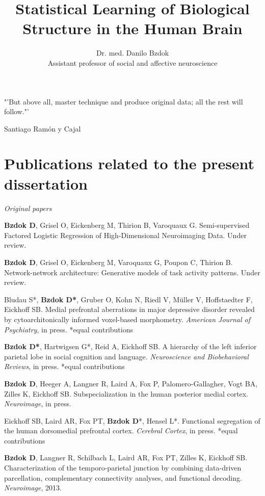 \documentclass[authoryear,review,3p]{elsarticle}
\begin{document}
  
\begin{frontmatter}

\title{Statistical Learning of Biological Structure in the Human Brain}

\author{Dr. med. Danilo Bzdok\\
Assistant professor of social and affective neuroscience}

\end{frontmatter}

"'But above all, master technique and produce original data; 
all the rest will follow."'

Santiago Ram\'{o}n y Cajal

\bigskip

\newpage
\section*{Publications related to the present dissertation}
\linebreak
\textit{Original papers}

\textbf{Bzdok D}, Grisel O, Eickenberg M, Thirion B, Varoquaux G.
Semi-supervised Factored Logistic Regression of High-Dimensional
Neuroimaging Data. Under review.

\textbf{Bzdok D}, Grisel O, Eickenberg M, Varoquaux G, Poupon C, Thirion B.
Network-network architecture: Generative models of task activity patterns.
Under review.

Bludau S*, \textbf{Bzdok D*}, Gruber O,
Kohn N, Riedl V, Müller V, Hoffstaedter F, Eickhoff SB.
Medial prefrontal aberrations in major depressive disorder
revealed by cytoarchitonically informed voxel-based morphometry.
\textit{American Journal of Psychiatry}, in press. *equal contributions

\textbf{Bzdok D*}, Hartwigsen G*, Reid A, Eickhoff SB.
A hierarchy of the left inferior parietal lobe in social cognition and
language.
\textit{Neuroscience and Biobehavioral Reviews}, in press. *equal contributions

\textbf{Bzdok D}, Heeger A, Langner R, Laird A, Fox P, Palomero-Gallagher,
Vogt BA, Zilles K, Eickhoff SB.
Subspecialization in the human posterior medial cortex.
\textit{Neuroimage}, in press.

Eickhoff SB, Laird AR, Fox PT, \textbf{Bzdok D}*, Hensel L*.
Functional segregation of the human dorsomedial prefrontal cortex.
\textit{Cerebral Cortex}, in press. *equal contributions

\textbf{Bzdok D}, Langner R, Schilbach L, Laird AR, Fox PT, Zilles K, Eickhoff SB.
Characterization of the temporo-parietal junction by combining data-driven
parcellation, complementary connectivity analyses, and functional decoding.
\textit{Neuroimage}, 2013.
\end{document}
